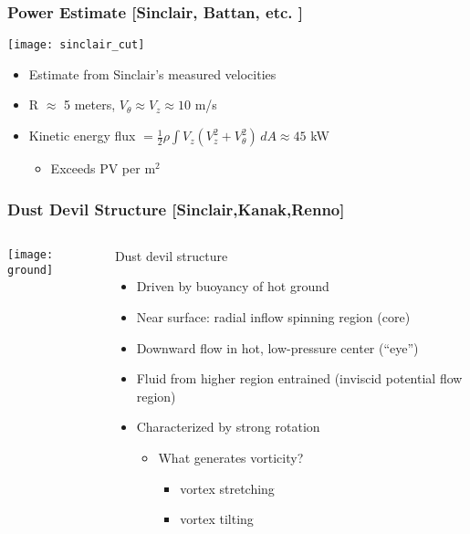 \documentclass[mathserif]{beamer}
\newcommand{\myred}[1]{{\color{red} #1}}
\begin{document}
%
%
%
\begin{frame}
\frametitle{Power Estimate [Sinclair, Battan, etc. ]}

   \begin{center}
    \texttt{[image: sinclair\_cut]}
   \end{center}

\begin{itemize}
  \item Estimate from Sinclair's measured velocities 
  \item R $\approx$ 5 meters, $V_{\theta} \approx V_{z} \approx 10$ m/s 
  \item Kinetic energy flux $ = \frac{1}{2}\rho \int V_z (V_z^2 + V_{\theta}^2)
	\, dA \approx 45$ kW
 \begin{itemize}
  \item Exceeds PV per $\text{m}^2$
 \end{itemize}
\end{itemize}

\end{frame}

\begin{frame}
\frametitle{Dust Devil Structure [Sinclair,Kanak,Renno]}

\begin{columns}[]
  \begin{column}{0.45\linewidth}
   \begin{center}
    \texttt{[image: ground]}
   \end{center}
  \end{column}
  \begin{column}{0.55\linewidth}
    \begin{block}{Dust devil structure}
    \begin{itemize}
     \item Driven by buoyancy of hot ground
     \item Near surface: radial inflow spinning region (core) 
     \item Downward flow in \myred{hot}, low-pressure  center (``eye'')
     \item Fluid from higher region entrained (inviscid potential flow region)
     \item Characterized by strong rotation
     \begin{itemize}
      \item What generates vorticity?
        \begin{itemize}
        \item vortex stretching
        \item vortex tilting
          \end{itemize}
     \end{itemize}
    \end{itemize}
   \end{block}
  \end{column}
\end{columns}

\end{frame}
\end{document}
